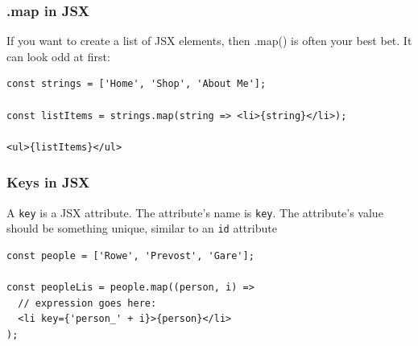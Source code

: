\documentclass[a4paper, 12pt]{article}
\begin{document}
\subsubsection{.map in JSX}
If you want to create a list of JSX elements, then .map() is often your best bet. It can look odd at first:
\begin{verbatim}
const strings = ['Home', 'Shop', 'About Me'];

const listItems = strings.map(string => <li>{string}</li>);

<ul>{listItems}</ul>
\end{verbatim}

\subsubsection{Keys in JSX}
A \verb|key| is a JSX attribute. The attribute's name is \verb|key|. The attribute's value should be something unique, similar to an \verb|id| attribute
\begin{verbatim}
const people = ['Rowe', 'Prevost', 'Gare'];

const peopleLis = people.map((person, i) =>
  // expression goes here:
  <li key={'person_' + i}>{person}</li>
);
\end{verbatim}
\end{document}
